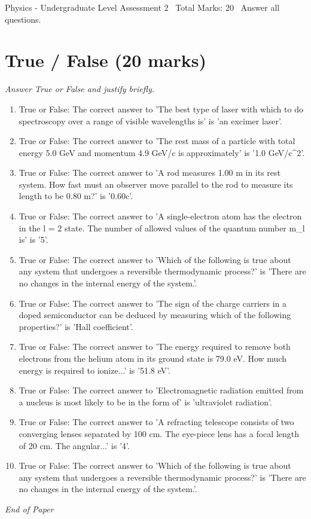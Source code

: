 \documentclass[12pt]{article}
\begin{document}
\begin{center}
Physics - Undergraduate Level Assessment 2 \
Total Marks: 20 \
Answer all questions.
\end{center}

\section*{True / False (20 marks)}
\textit{Answer True or False and justify briefly.}
\begin{enumerate}[label=\arabic*.]
\item True or False: The correct answer to 'The best type of laser with which to do spectroscopy over a range of visible wavelengths is' is 'an excimer laser'.
\item True or False: The correct answer to 'The rest mass of a particle with total energy 5.0 GeV and momentum 4.9 GeV/c is approximately' is '1.0 GeV/c\^{}2'.
\item True or False: The correct answer to 'A rod measures 1.00 m in its rest system. How fast must an observer move parallel to the rod to measure its length to be 0.80 m?' is '0.60c'.
\item True or False: The correct answer to 'A single-electron atom has the electron in the l = 2 state. The number of allowed values of the quantum number m\_l is' is '5'.
\item True or False: The correct answer to 'Which of the following is true about any system that undergoes a reversible thermodynamic process?' is 'There are no changes in the internal energy of the system.'.
\item True or False: The correct answer to 'The sign of the charge carriers in a doped semiconductor can be deduced by measuring which of the following properties?' is 'Hall coefficient'.
\item True or False: The correct answer to 'The energy required to remove both electrons from the helium atom in its ground state is 79.0 eV. How much energy is required to ionize...' is '51.8 eV'.
\item True or False: The correct answer to 'Electromagnetic radiation emitted from a nucleus is most likely to be in the form of' is 'ultraviolet radiation'.
\item True or False: The correct answer to 'A refracting telescope consists of two converging lenses separated by 100 cm. The eye-piece lens has a focal length of 20 cm. The angular...' is '4'.
\item True or False: The correct answer to 'Which of the following is true about any system that undergoes a reversible thermodynamic process?' is 'There are no changes in the internal energy of the system.'.
\end{enumerate}

\vfill
\noindent\textit{End of Paper}
\end{document}
